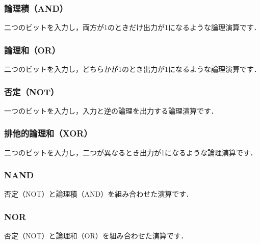 \subsubsection{論理積（AND）}
二つのビットを入力し，両方が1のときだけ出力が1になるような論理演算です．
\begin{center}
\end{center}

\subsubsection{論理和（OR）}
二つのビットを入力し，どちらかが1のとき出力が1になるような論理演算です．
\begin{center}
\end{center}

\subsubsection{否定（NOT）}
一つのビットを入力し，入力と逆の論理を出力する論理演算です．
\begin{center}
\end{center}

\subsubsection{排他的論理和（XOR）}
二つのビットを入力し，二つが異なるとき出力が1になるような論理演算です．
\begin{center}
\end{center}

\subsubsection{NAND}
否定（NOT）と論理積（AND）を組み合わせた演算です．
\begin{center}
\end{center}

\subsubsection{NOR}
否定（NOT）と論理和（OR）を組み合わせた演算です．
\begin{center}
\end{center}

